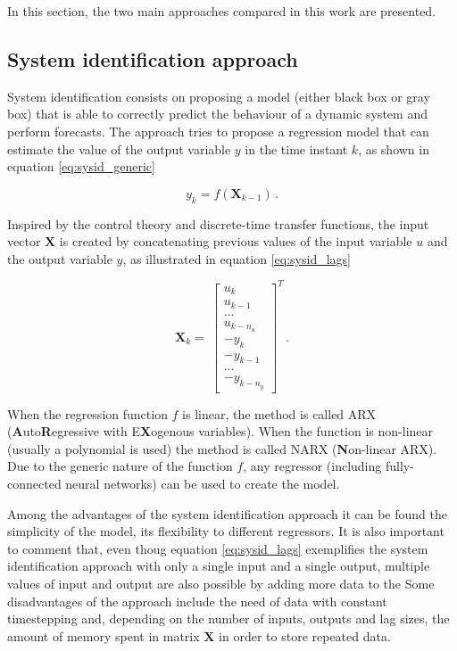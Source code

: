 \documentclass[conference]{IEEEtran}
\begin{document}
In this section, the two main approaches compared in this work are presented.

\subsection{System identification approach}

System identification consists on proposing a model (either black box or gray box) that is able
to correctly predict the behaviour of a dynamic system and perform forecasts. The approach tries 
to propose a regression model that can estimate the value of the output variable $y$ in the 
time instant $k$, as shown in equation \ref{eq:sysid_generic}

\begin{equation}\label{eq:sysid_generic}
    y_k = f(\mathbf{X}_{k-1})\,.
\end{equation}

Inspired by the control theory and discrete-time transfer functions, the input vector $\mathbf{X}$
is created by concatenating previous values of the input variable $u$ and the output variable $y$,
as illustrated in equation \ref{eq:sysid_lags}

\begin{equation}\label{eq:sysid_lags}
    \mathbf{X}_k = \
    \begin{bmatrix}
        u_{k} \\ u_{k-1} \\ ... \\ u_{k-n_u} \\ -y_{k} \\ -y_{k-1} \\ ... \\ -y_{k-n_y}
    \end{bmatrix}^T\,.
\end{equation}

When the regression function $f$ is linear, the method is called ARX (\textbf{A}uto\textbf{R}egressive
with E\textbf{X}ogenous variables). When the function is non-linear (usually a polynomial is used)
the method is called NARX (\textbf{N}on-linear ARX). Due to the generic nature of the function $f$,
any regressor (including fully-connected neural networks) can be used to create the model.

Among the advantages of the system identification approach it can be found the simplicity of the model,
its flexibility to different regressors. It is also important to comment that, even thoug equation \ref{eq:sysid_lags}
exemplifies the system identification approach with only a single input and a single output, multiple values of input and
output are also possible by adding more data to the
Some disadvantages of the approach include the need of data
with constant timestepping and, depending on the number of inputs, outputs and lag sizes, the amount of
memory spent in matrix $\mathbf{X}$ in order to store repeated data.
\end{document}
